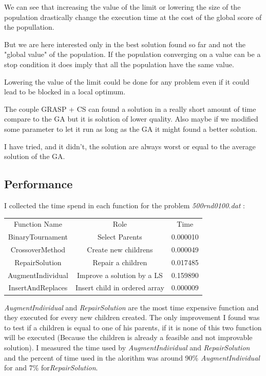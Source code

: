 \documentclass[12pt]{article}
\begin{document}
	We can see that increasing the value of the limit or lowering the size of the population drastically change the execution time at the cost of the global score of the popullation. 
	
	But we are here interested only in the best solution found so far and  not the "global value" of the population. 
	If the population converging on a value can be a stop condition it does imply that all the population have the same value.
	
	Lowering the value of the limit could be done for any problem even if it could lead to be blocked in a local optimum.
	
	The couple GRASP + CS can found a solution in a really short amount of time compare to the GA but it is solution of lower quality. Also maybe if we modified some parameter to let it run as long as the GA it might found a better solution.
	
	I have tried, and it didn't, the solution are always worst or equal to the average solution of the GA.
	\subsection{Performance}
	I collected the time spend in each function for the problem \textit{500rnd0100.dat} :
	\begin{center}
		\begin{tabular}{|c|c|c|}
			Function Name & Role & Time \\
			BinaryTournament & Select Parents & 0.000010 \\
			CrossoverMethod & Create new childrens & 0.000049\\
			RepairSolution & Repair a children & 0.017485 \\
			AugmentIndividual & Improve a solution by a LS & 0.159890 \\
			InsertAndReplaces & Insert child in ordered array & 0.000009 \\
		\end{tabular}
	\end{center}
	\textit{AugmentIndividual} and \textit{RepairSolution} are the most time expensive function and they executed for every new children created.
	The only improvement I found was to test if a children is equal to one of his parents, if it is none of this two function will be executed (Because the children is already a feasible and not improvable solution).
	I measured the time used by \textit{AugmentIndividual} and \textit{RepairSolution} and the percent of time used in the alorithm was around 90\% \textit{AugmentIndividual} for and 7\% for\textit{RepairSolution}.
	
\end{document}
